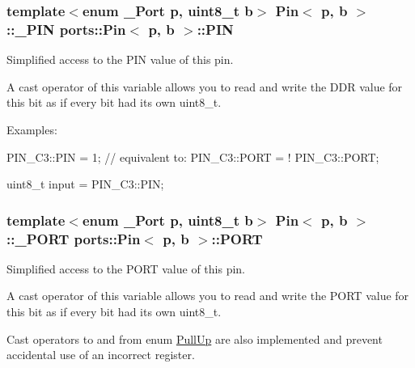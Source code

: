 \subsubsection[{\texorpdfstring{P\+IN}{PIN}}]{\setlength{\rightskip}{0pt plus 5cm}template$<$enum \+\_\+\+Port p, uint8\+\_\+t b$>$ {\bf Pin}$<$ p, b $>$\+::{\bf \+\_\+\+P\+IN} {\bf ports\+::\+Pin}$<$ p, b $>$\+::P\+IN\hspace{0.3cm}{\ttfamily [static]}}\hypertarget{structports_1_1Pin_ae2e45a41082457c350f71f7a720265d4}{}\label{structports_1_1Pin_ae2e45a41082457c350f71f7a720265d4}


Simplified access to the P\+IN value of this pin. 

A cast operator of this variable allows you to read and write the D\+DR value for this bit as if every bit had its own uint8\+\_\+t.

Examples\+:


\begin{DoxyItemize}
\item {\ttfamily P\+I\+N\+\_\+\+C3\+::\+P\+IN = 1; // equivalent to\+: P\+I\+N\+\_\+\+C3\+::\+P\+O\+RT = ! P\+I\+N\+\_\+\+C3\+::\+P\+O\+RT;}
\item {\ttfamily uint8\+\_\+t input = P\+I\+N\+\_\+\+C3\+::\+P\+IN;} 
\end{DoxyItemize}
\subsubsection[{\texorpdfstring{P\+O\+RT}{PORT}}]{\setlength{\rightskip}{0pt plus 5cm}template$<$enum \+\_\+\+Port p, uint8\+\_\+t b$>$ {\bf Pin}$<$ p, b $>$\+::{\bf \+\_\+\+P\+O\+RT} {\bf ports\+::\+Pin}$<$ p, b $>$\+::P\+O\+RT\hspace{0.3cm}{\ttfamily [static]}}\hypertarget{structports_1_1Pin_aaa08f0eb17ef31d9f46d65d50c8a093e}{}\label{structports_1_1Pin_aaa08f0eb17ef31d9f46d65d50c8a093e}


Simplified access to the P\+O\+RT value of this pin. 

A cast operator of this variable allows you to read and write the P\+O\+RT value for this bit as if every bit had its own {\ttfamily uint8\+\_\+t}.

Cast operators to and from enum \hyperlink{namespaceports_a49bf0ccedb4cfed89a328574e53bec07}{Pull\+Up} are also implemented and prevent accidental use of an incorrect register.

